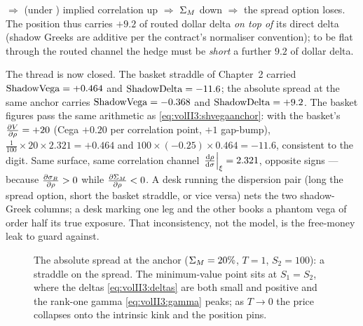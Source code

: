 \begin{example}
\begin{itemize}[itemsep=0.2em]
      $\Rightarrow$ (under \stickycvc) implied correlation up $\Rightarrow$
      $\Sigma_M$ down $\Rightarrow$ the spread option loses. The position thus
      carries $+9.2$ of routed dollar delta \emph{on top of} its direct delta
      (shadow Greeks are additive per the contract's normaliser convention);
      to be flat through the routed channel the hedge must be \emph{short} a
      further $9.2$ of dollar delta.
\end{itemize}
The thread is now closed. The basket straddle of Chapter~2 carried
$\mathrm{ShadowVega} = +0.464$ and $\mathrm{ShadowDelta} = -11.6$; the absolute spread at the same
anchor carries $\mathrm{ShadowVega} = -0.368$ and $\mathrm{ShadowDelta} = +9.2$. The basket figures
pass the same arithmetic as \eqref{eq:volII3:shvegaanchor}: with the basket's
$\frac{\partial V}{\partial \rho} = +20$ (Cega $+0.20$ per correlation point, $+1$ gap-bump),
$\tfrac{1}{100} \times 20 \times 2.321 = +0.464$ and $100 \times (-0.25)
\times 0.464 = -11.6$, consistent to the digit. Same surface, same
correlation channel $\left.\frac{\mathrm{d} \rho}{\mathrm{d} \sigma}\right|_{\xi} = 2.321$, opposite
signs --- because $\frac{\partial \sigma_B}{\partial \rho} > 0$ while $\frac{\partial \Sigma_M}{\partial \rho} < 0$. A desk
running the dispersion pair (long the spread option, short the basket
straddle, or vice versa) nets the two shadow-Greek columns; a desk marking one
leg \stickyrho{} and the other \stickycvc{} books a phantom vega of order
half its true exposure. That inconsistency, not the model, is the free-money
leak to guard against.
\end{example}

\begin{figure}[ht]
\centering
{}
\caption{The absolute spread at the anchor ($\Sigma_M = 20\%$, $T = 1$,
$S_2 = 100$): a straddle on the spread. The minimum-value point sits at
$S_1 = S_2$, where the deltas \eqref{eq:volII3:deltas} are both small and
positive and the rank-one gamma \eqref{eq:volII3:gamma} peaks; as $T \to 0$
the price collapses onto the intrinsic kink and the position pins.}
\label{fig:volII3:payoff}
\end{figure}

